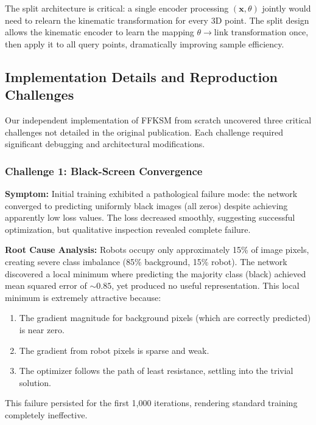 \documentclass[12pt,a4paper,oneside]{report}
\begin{document}
The split architecture is critical: a single encoder processing $(\mathbf{x}, \theta)$ jointly would need to relearn the kinematic transformation for every 3D point. The split design allows the kinematic encoder to learn the mapping $\theta \rightarrow \text{link transformation}$ once, then apply it to all query points, dramatically improving sample efficiency.

\subsection{Implementation Details and Reproduction Challenges}
\label{subsec:implementation_details_and_reproduction_challenges}

Our independent implementation of FFKSM from scratch uncovered three critical challenges not detailed in the original publication. Each challenge required significant debugging and architectural modifications.

\subsubsection{Challenge 1: Black-Screen Convergence}
\label{subsubsec:challenge_1_black_screen_convergence}

\textbf{Symptom:} Initial training exhibited a pathological failure mode: the network converged to predicting uniformly black images (all zeros) despite achieving apparently low loss values. The loss decreased smoothly, suggesting successful optimization, but qualitative inspection revealed complete failure.

\textbf{Root Cause Analysis:} Robots occupy only approximately 15\% of image pixels, creating severe class imbalance (85\% background, 15\% robot). The network discovered a local minimum where predicting the majority class (black) achieved mean squared error of $\sim 0.85$, yet produced no useful representation. This local minimum is extremely attractive because:

\begin{enumerate}
    \item The gradient magnitude for background pixels (which are correctly predicted) is near zero.
    \item The gradient from robot pixels is sparse and weak.
    \item The optimizer follows the path of least resistance, settling into the trivial solution.
\end{enumerate}

This failure persisted for the first 1,000 iterations, rendering standard training completely ineffective.
\end{document}
